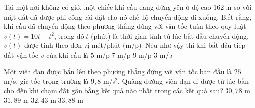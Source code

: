 \begin{ex}%
Tại một nơi không có gió, một chiếc khí cầu đang đứng yên ở độ cao $162$ m so với mặt đất đã được phi công cài đặt cho nó chế độ chuyển động đi xuống. Biết rằng, khí cầu đã chuyển động theo phương thẳng đứng với vận tốc tuân theo quy luật $v(t)=10t-t^2$, trong đó $t$ (phút) là thời gian tính từ lúc bắt đầu chuyển động, $v(t)$ được tính theo đơn vị mét/phút (m/p). Nếu như vậy thì khi bắt đầu tiếp đất vận tốc $v$ của khí cầu là
\choice
{$5$ m/p}
{$7$ m/p}
{\True $9$ m/p}
{$3$ m/p}
\end{ex}

\begin{ex}%
Một viên đạn được bắn lên theo phương thẳng đứng với vận tốc ban đầu là $25$ m/s, gia tốc trọng trường là $9{,}8$ m/s$^2$. Quãng đường viên đạn đi được từ lúc bắn cho đến khi chạm đất gần bằng kết quả nào nhất trong các kết quả sau?
\choice
{$30{,}78$ m}
{\True $31{,}89$ m}
{$32{,}43$ m}
{$33{,}88$ m}
\end{ex}

